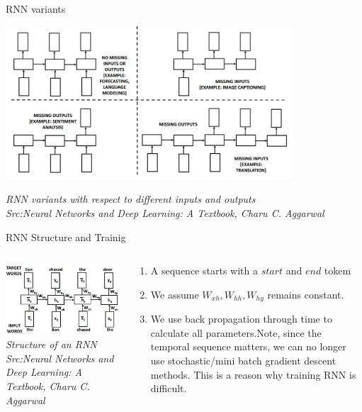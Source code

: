 \begin{frame}{RNN variants}
	\begin{center}
		\includegraphics[width=0.8\textwidth]{images/RNN variant.png}
	\end{center}
	\tiny{\textit{RNN variants with respect to different inputs and outputs\\Src:Neural Networks and Deep Learning: A Textbook, Charu C. Aggarwal }}
\end{frame}
\begin{frame}{RNN Structure and Trainig}
	\begin{columns}[T]
        \begin{column}{0.4\textwidth}
        	\includegraphics[width=\textwidth]{images/RNN struct.png}
			\tiny{\textit{Structure of an RNN\\Src:Neural Networks and Deep Learning: A Textbook, Charu C. Aggarwal  }}
        \end{column}
		\begin{column}{0.6\textwidth}
			\begin{enumerate}[$\bullet$]
				\item A sequence starts with a $start$ and $end$ tokem\pause
				\item We assume $W_{xh},W_{hh},W_{hy}$ remains constant.\pause
				\item We use back propagation through time to calculate all parameters.\pause Note, since the temporal sequence matters, we can no longer use stochastic/mini batch gradient descent methods. This is a reason why training RNN is difficult.
			\end{enumerate}
		\end{column} 
    \end{columns}
\end{frame}

